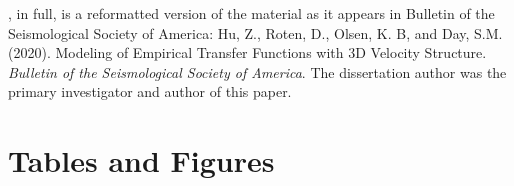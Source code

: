 {, in full, is a reformatted version of the material as it appears in Bulletin of the Seismological Society of America: Hu, Z., Roten, D., Olsen, K. B, and Day, S.M. (2020). Modeling of Empirical Transfer Functions with 3D Velocity Structure. \emph{Bulletin of the Seismological Society of America}. The dissertation author was the primary investigator and author of this paper.

\newpage
\section*{Tables and Figures}
%


}

